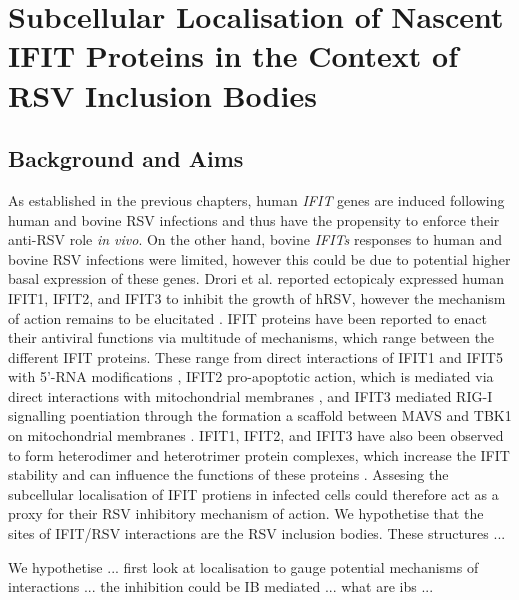 \chapter{Subcellular Localisation of Nascent IFIT Proteins in the Context of RSV Inclusion Bodies} \label{ch:Subcellular Localisation of Nascent IFIT Proteins in the Context of RSV Inclusion Bodies}
\section{Background and Aims} \label{sec:Background and Aims-Chapter3}









As established in the previous chapters, human \textit{IFIT} genes are induced following human and bovine RSV infections and thus have the propensity to enforce their anti-RSV role \textit{in vivo}. On the other hand, bovine \textit{IFITs} responses to human and bovine RSV infections were limited, however this could be due to potential higher basal expression of these genes. Drori et al. reported ectopicaly expressed human IFIT1, IFIT2, and IFIT3 to inhibit the growth of hRSV, however the mechanism of action remains to be elucitated \cite{Drori2020InfluenzaProteins}. IFIT proteins have been reported to enact their antiviral functions via multitude of mechanisms, which range between the different IFIT proteins. These range from direct interactions of IFIT1 and IFIT5 with 5'-RNA modifications \cite{Abbas2013StructuralProteins, Diamond2014IFIT1:Translation}, IFIT2 pro-apoptotic action, which is mediated via direct interactions with mitochondrial membranes \cite{Chen2017InhibitionApoptosis}, and IFIT3 mediated RIG-I signalling poentiation through the formation a scaffold between MAVS and TBK1 on mitochondrial membranes \cite{Liu2011IFN-InducedTBK1}. IFIT1, IFIT2, and IFIT3 have also been observed to form heterodimer and heterotrimer protein complexes, which increase the IFIT stability and can influence the functions of these proteins \cite{Mears2018BetterResponse}. Assesing the subcellular localisation of IFIT protiens in infected cells could therefore act as a proxy for their RSV inhibitory mechanism of action. We hypothetise that the sites of IFIT/RSV interactions are the RSV inclusion bodies. These structures ...




We hypothetise ... first look at localisation to gauge potential mechanisms of interactions ... the inhibition could be IB mediated ... what are ibs ... 




